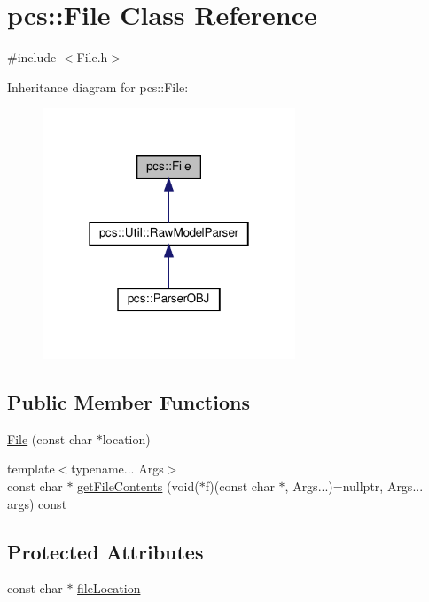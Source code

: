 \hypertarget{classpcs_1_1File}{}\section{pcs\+:\+:File Class Reference}
\label{classpcs_1_1File}


{\ttfamily \#include $<$File.\+h$>$}



Inheritance diagram for pcs\+:\+:File\+:\nopagebreak
\begin{figure}[H]
\begin{center}
\leavevmode
\includegraphics[width=214pt]{classpcs_1_1File__inherit__graph}
\end{center}
\end{figure}
\subsection*{Public Member Functions}
\begin{DoxyCompactItemize}
\item 
\hyperlink{classpcs_1_1File_a26d8a7d8ce42c0217b42845eee341c56}{File} (const char $\ast$location)
\item 
{\footnotesize template$<$typename... Args$>$ }\\const char $\ast$ \hyperlink{classpcs_1_1File_a63b32c52dd5d6d3fa51a0178eae44ab4}{get\+File\+Contents} (void($\ast$f)(const char $\ast$, Args...)=nullptr, Args... args) const
\end{DoxyCompactItemize}
\subsection*{Protected Attributes}
\begin{DoxyCompactItemize}
\item 
const char $\ast$ \hyperlink{classpcs_1_1File_aba44c03eedf48cbe021f05680bfe6614}{file\+Location}
\end{DoxyCompactItemize}


